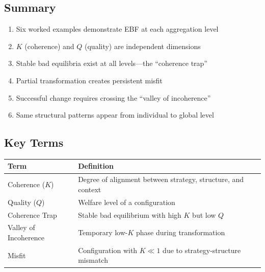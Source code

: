 
\subsection{Summary}

\begin{tcolorbox}[colback=gray!5!white, colframe=gray!75!black,
    title=\textbf{Summary: Appendix EXM Key Points}]

\begin{enumerate}
    \item Six worked examples demonstrate EBF at each aggregation level
    \item $K$ (coherence) and $Q$ (quality) are independent dimensions
    \item Stable bad equilibria exist at all levels—the ``coherence trap''
    \item Partial transformation creates persistent misfit
    \item Successful change requires crossing the ``valley of incoherence''
    \item Same structural patterns appear from individual to global level
\end{enumerate}

\end{tcolorbox}


\subsection{Key Terms}

\begin{tabular}{@{}p{3cm}p{9cm}@{}}
\textbf{Term} & \textbf{Definition} \\
\hline
Coherence ($K$) & Degree of alignment between strategy, structure, and context \\
Quality ($Q$) & Welfare level of a configuration \\
Coherence Trap & Stable bad equilibrium with high $K$ but low $Q$ \\
Valley of Incoherence & Temporary low-$K$ phase during transformation \\
Misfit & Configuration with $K \ll 1$ due to strategy-structure mismatch \\
\end{tabular}

